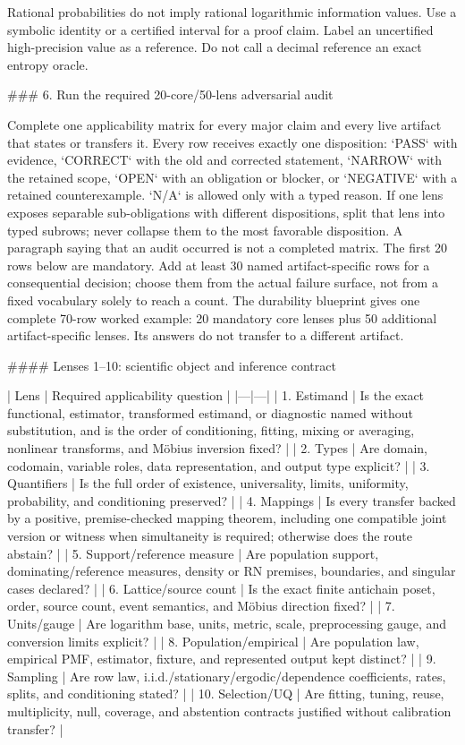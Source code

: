 \documentclass[11pt]{article}
\begin{document}
\begin{markdown}
Rational probabilities do not imply rational logarithmic information values. Use a symbolic
identity or a certified interval for a proof claim. Label an uncertified high-precision value as a
reference. Do not call a decimal reference an exact entropy oracle.

### 6. Run the required 20-core/50-lens adversarial audit

Complete one applicability matrix for every major claim and every live artifact that states or
transfers it. Every row receives exactly one disposition: `PASS` with evidence, `CORRECT` with the
old and corrected statement, `NARROW` with the retained scope, `OPEN` with an obligation or blocker,
or `NEGATIVE` with a retained counterexample. `N/A` is allowed only with a typed reason. If one lens
exposes separable sub-obligations with different dispositions, split that lens into typed subrows;
never collapse them to the most favorable disposition. A paragraph saying that an audit occurred
is not a completed matrix. The first 20 rows below are mandatory. Add at least 30 named
artifact-specific rows for a consequential decision; choose them from the actual failure surface,
not from a fixed vocabulary solely to reach a count. The durability blueprint gives one complete
70-row worked example: 20 mandatory core lenses plus 50 additional artifact-specific lenses. Its
answers do not transfer to a different artifact.

#### Lenses 1--10: scientific object and inference contract

| Lens | Required applicability question |
|---|---|
| 1. Estimand | Is the exact functional, estimator, transformed estimand, or diagnostic named without substitution, and is the order of conditioning, fitting, mixing or averaging, nonlinear transforms, and Möbius inversion fixed? |
| 2. Types | Are domain, codomain, variable roles, data representation, and output type explicit? |
| 3. Quantifiers | Is the full order of existence, universality, limits, uniformity, probability, and conditioning preserved? |
| 4. Mappings | Is every transfer backed by a positive, premise-checked mapping theorem, including one compatible joint version or witness when simultaneity is required; otherwise does the route abstain? |
| 5. Support/reference measure | Are population support, dominating/reference measures, density or RN premises, boundaries, and singular cases declared? |
| 6. Lattice/source count | Is the exact finite antichain poset, order, source count, event semantics, and Möbius direction fixed? |
| 7. Units/gauge | Are logarithm base, units, metric, scale, preprocessing gauge, and conversion limits explicit? |
| 8. Population/empirical | Are population law, empirical PMF, estimator, fixture, and represented output kept distinct? |
| 9. Sampling | Are row law, i.i.d./stationary/ergodic/dependence coefficients, rates, splits, and conditioning stated? |
| 10. Selection/UQ | Are fitting, tuning, reuse, multiplicity, null, coverage, and abstention contracts justified without calibration transfer? |


\end{markdown}
\end{document}
